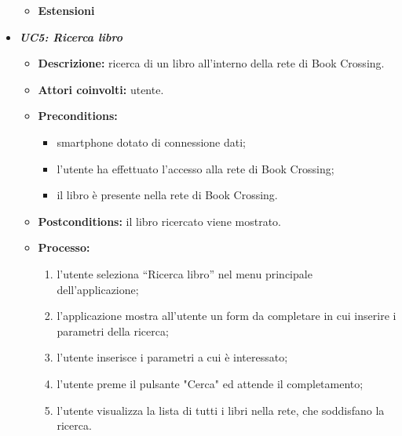 \begin{itemize}
\begin{itemize}
\begin{itemize}
		\end{itemize}
		\item \textbf{Estensioni}
	\end{itemize}
	\item \textbf{\textit{UC5: Ricerca libro}}
	\begin{itemize}
		\item \textbf{Descrizione:} ricerca di un libro all’interno della rete di Book Crossing.
		\item \textbf{Attori coinvolti:} utente.
		\item \textbf{Preconditions:}
		\begin{itemize}
			\item smartphone dotato di connessione dati;
			\item l’utente ha effettuato l’accesso alla rete di Book Crossing;
			\item il libro è presente nella rete di Book Crossing.
		\end{itemize}
		\item \textbf{Postconditions:} il libro ricercato viene mostrato.
		\item \textbf{Processo:}
		\begin{enumerate}
			\item l’utente seleziona “Ricerca libro” nel menu principale dell’applicazione;
			\item l’applicazione mostra all'utente un form da completare in cui inserire i parametri della ricerca;
			\item l’utente inserisce i parametri a cui è interessato;
			\item l'utente preme il pulsante "Cerca" ed attende il completamento;
			\item l'utente visualizza la lista di tutti i libri nella rete, che soddisfano la ricerca.
			

\end{enumerate}
\end{itemize}
\end{itemize}
